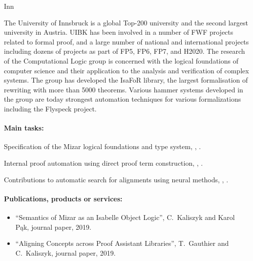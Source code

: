 \begin{sitedescription}{Inn}

The University of Innsbruck is a global Top-200 university and the second
largest university in Austria. UIBK has been involved in a number of FWF
projects related to formal proof, and a large number of national and
international projects including dozens of projects as part of FP5,
FP6, FP7, and H2020.
%
The research of the Computational Logic group is concerned with the logical
foundations of computer science and their application to the analysis and
verification of complex systems. The group has developed the IsaFoR library,
the largest formalisation of rewriting with more than 5000 theorems. Various
hammer systems developed in the group are today strongest automation techniques
for various formalizations including the Flyspeck project.

\paragraph*{Main tasks:}

\begin{compactitem}
\item Specification of the Mizar logical foundations and type system, , .
\item Internal proof automation using direct proof term construction, %
  , .
\item Contributions to automatic search for alignments using neural methods, , .
\end{compactitem}

\paragraph*{Publications, products or services:}
\begin{itemize}
\item ``Semantics of Mizar as an Isabelle Object Logic'', C.~Kaliszyk and Karol Pąk,
journal paper, 2019.

\item ``Aligning Concepts across Proof Assistant Libraries'', T.~Gauthier and C.~Kaliszyk, journal paper, 2019.


\end{itemize}
\end{sitedescription}
